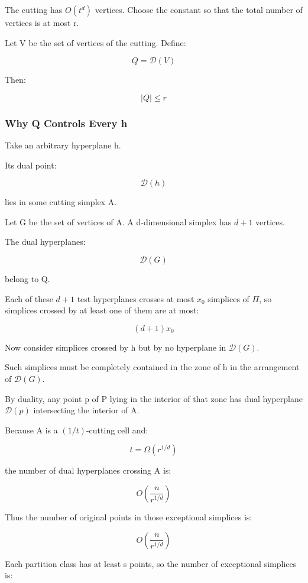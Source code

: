 \documentclass[
  11pt,
]{article}
\begin{document}
The cutting has \(O(t^d)\) vertices. Choose the constant so that the
total number of vertices is at most r.

Let V be the set of vertices of the cutting. Define:

\[
Q=\mathcal{D}(V)
\]

Then:

\[
|Q|\le r
\]

\hypertarget{why-q-controls-every-h}{%
\subsubsection{Why Q Controls Every h}\label{why-q-controls-every-h}}

Take an arbitrary hyperplane h.

Its dual point:

\[
\mathcal{D}(h)
\]

lies in some cutting simplex A.

Let G be the set of vertices of A. A d-dimensional simplex has \(d+1\)
vertices.

The dual hyperplanes:

\[
\mathcal{D}(G)
\]

belong to Q.

Each of these \(d+1\) test hyperplanes crosses at most \(x_0\) simplices
of \(\Pi\), so simplices crossed by at least one of them are at most:

\[
(d+1)x_0
\]

Now consider simplices crossed by h but by no hyperplane in
\(\mathcal{D}(G)\).

Such simplices must be completely contained in the zone of h in the
arrangement of \(\mathcal{D}(G)\).

By duality, any point p of P lying in the interior of that zone has dual
hyperplane \(\mathcal{D}(p)\) intersecting the interior of A.

Because A is a \((1/t)\)-cutting cell and:

\[
t=\Omega(r^{1/d})
\]

the number of dual hyperplanes crossing A is:

\[
O\left(\frac{n}{r^{1/d}}\right)
\]

Thus the number of original points in those exceptional simplices is:

\[
O\left(\frac{n}{r^{1/d}}\right)
\]

Each partition class has at least s points, so the number of exceptional
simplices is:
\end{document}
